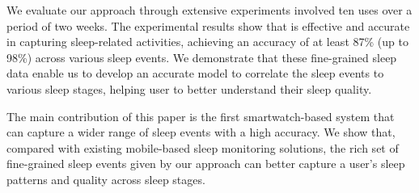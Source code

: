  We evaluate our approach through extensive experiments involved ten uses over a period of two weeks. The experimental results
show that {\systemname} is effective and accurate in capturing sleep-related activities, achieving an accuracy of at least 87\% (up to
98\%) across various sleep events. We demonstrate that these fine-grained sleep data enable us to develop an accurate model to correlate
the sleep events to various sleep stages, helping user to better understand their sleep quality. 

The main contribution of this paper is the first smartwatch-based system that can capture a wider range of sleep events with a high
accuracy. We show that, compared with existing mobile-based sleep monitoring solutions, the rich set of fine-grained sleep events given by
our approach can better capture a user's sleep patterns and quality across sleep stages.
